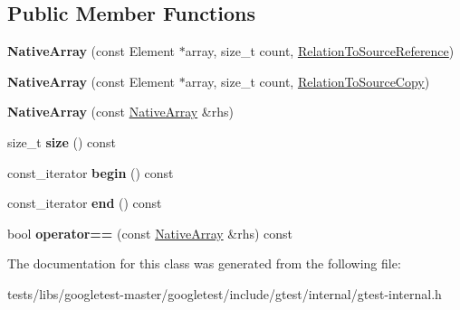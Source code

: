 \subsection*{Public Member Functions}
\begin{DoxyCompactItemize}
\item 
\mbox{\label{classtesting_1_1internal_1_1NativeArray_a52b3689c62532703d11e9d82939a7141}} 
{\bfseries Native\+Array} (const Element $\ast$array, size\+\_\+t count, \hyperlink{structtesting_1_1internal_1_1RelationToSourceReference}{Relation\+To\+Source\+Reference})
\item 
\mbox{\label{classtesting_1_1internal_1_1NativeArray_ac184ee5741af5be3402213819c834405}} 
{\bfseries Native\+Array} (const Element $\ast$array, size\+\_\+t count, \hyperlink{structtesting_1_1internal_1_1RelationToSourceCopy}{Relation\+To\+Source\+Copy})
\item 
\mbox{\label{classtesting_1_1internal_1_1NativeArray_abb346ac3040f5da733f594cc2d5958bc}} 
{\bfseries Native\+Array} (const \hyperlink{classtesting_1_1internal_1_1NativeArray}{Native\+Array} \&rhs)
\item 
\mbox{\label{classtesting_1_1internal_1_1NativeArray_af96a4a5ca0cdd5d163c47a081f08bd89}} 
size\+\_\+t {\bfseries size} () const
\item 
\mbox{\label{classtesting_1_1internal_1_1NativeArray_a3046d93cfa23097e7b7c91f5f982dc78}} 
const\+\_\+iterator {\bfseries begin} () const
\item 
\mbox{\label{classtesting_1_1internal_1_1NativeArray_ae1cda748e49c6906421c6183c4d07c5a}} 
const\+\_\+iterator {\bfseries end} () const
\item 
\mbox{\label{classtesting_1_1internal_1_1NativeArray_a81b90f5739ed812610e68dc34c9e3850}} 
bool {\bfseries operator==} (const \hyperlink{classtesting_1_1internal_1_1NativeArray}{Native\+Array} \&rhs) const
\end{DoxyCompactItemize}


The documentation for this class was generated from the following file\+:\begin{DoxyCompactItemize}
\item 
tests/libs/googletest-\/master/googletest/include/gtest/internal/gtest-\/internal.\+h\end{DoxyCompactItemize}
